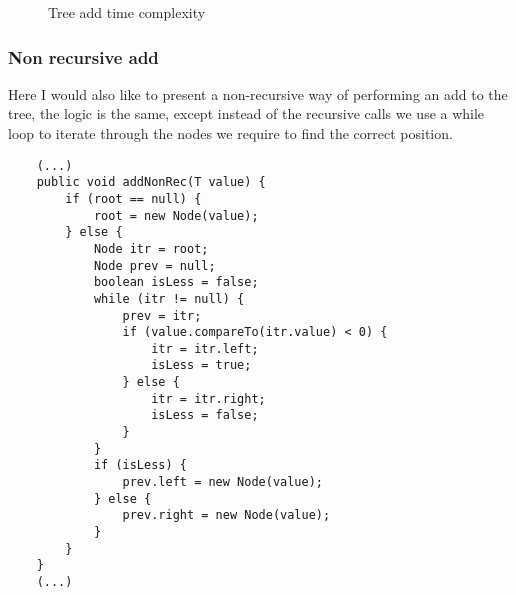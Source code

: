 \documentclass[a4paper,11pt]{article}
\begin{document}
\begin{figure}[H]
    \centering
    \caption{Tree add time complexity}
    \label{fig:plot1}
\end{figure}

\subsubsection*{Non recursive add}
Here I would also like to present a non-recursive way of performing an add to the tree, the logic is the same, except instead of the recursive calls we use a while loop to iterate through the nodes we require to find the correct position.

\begin{verbatim}
    (...)
    public void addNonRec(T value) {
        if (root == null) {
            root = new Node(value);
        } else {
            Node itr = root;
            Node prev = null;
            boolean isLess = false;
            while (itr != null) {
                prev = itr;
                if (value.compareTo(itr.value) < 0) {
                    itr = itr.left;
                    isLess = true;
                } else {
                    itr = itr.right;
                    isLess = false;
                }
            }
            if (isLess) {
                prev.left = new Node(value);
            } else {
                prev.right = new Node(value);
            }
        }
    }
    (...)
\end{verbatim}
\end{document}
